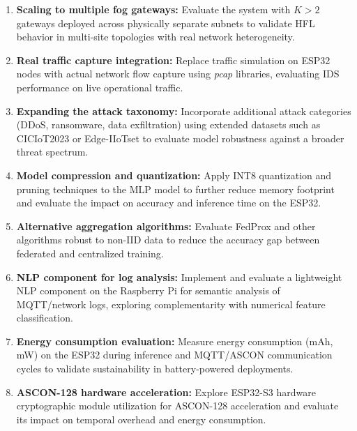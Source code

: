 \begin{enumerate}
    \item \textbf{Scaling to multiple fog gateways:} Evaluate the system with $K > 2$ gateways deployed across physically separate subnets to validate HFL behavior in multi-site topologies with real network heterogeneity.

    \item \textbf{Real traffic capture integration:} Replace traffic simulation on ESP32 nodes with actual network flow capture using \textit{pcap} libraries, evaluating IDS performance on live operational traffic.

    \item \textbf{Expanding the attack taxonomy:} Incorporate additional attack categories (DDoS, ransomware, data exfiltration) using extended datasets such as CICIoT2023 or Edge-IIoTset to evaluate model robustness against a broader threat spectrum.

    \item \textbf{Model compression and quantization:} Apply INT8 quantization and pruning techniques to the MLP model to further reduce memory footprint and evaluate the impact on accuracy and inference time on the ESP32.

    \item \textbf{Alternative aggregation algorithms:} Evaluate FedProx \cite{Li2020FedProx} and other algorithms robust to non-IID data to reduce the accuracy gap between federated and centralized training.

    \item \textbf{NLP component for log analysis:} Implement and evaluate a lightweight NLP component on the Raspberry Pi for semantic analysis of MQTT/network logs, exploring complementarity with numerical feature classification.

    \item \textbf{Energy consumption evaluation:} Measure energy consumption (mAh, mW) on the ESP32 during inference and MQTT/ASCON communication cycles to validate sustainability in battery-powered deployments.

    \item \textbf{ASCON-128 hardware acceleration:} Explore ESP32-S3 hardware cryptographic module utilization for ASCON-128 acceleration and evaluate its impact on temporal overhead and energy consumption.
\end{enumerate}
